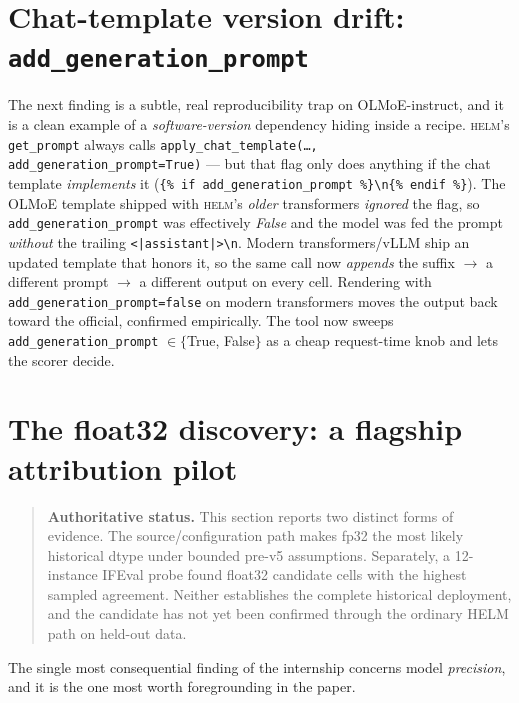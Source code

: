 \documentclass[11pt]{report}
\newcommand{\code}[1]{\texttt{#1}}
\newcommand{\evidencebox}[2]{\begin{quote}\noindent\textbf{#1.} #2\end{quote}}
\begin{document}
\section{Chat-template version drift: \code{add\_generation\_prompt}}
\label{sec:addgenprompt}

The next finding is a subtle, real reproducibility trap on OLMoE-instruct, and it
is a clean example of a \emph{software-version} dependency hiding inside a recipe.
\textsc{helm}'s \code{get\_prompt} always calls
\code{apply\_chat\_template(\ldots, add\_generation\_prompt=True)} --- but that flag
only does anything if the chat template \emph{implements} it
(\code{\{\% if add\_generation\_prompt \%\}<|assistant|>\textbackslash n\{\% endif \%\}}).
The OLMoE template shipped with \textsc{helm}'s \emph{older} transformers
\emph{ignored} the flag, so \code{add\_generation\_prompt} was effectively
\emph{False} and the model was fed the prompt \emph{without} the trailing
\code{<|assistant|>\textbackslash n}. Modern transformers/vLLM ship an updated
template that honors it, so the same call now \emph{appends} the suffix
$\rightarrow$ a different prompt $\rightarrow$ a different output on every cell.
Rendering with \code{add\_generation\_prompt=false} on modern transformers moves
the output back toward the official, confirmed empirically. The tool now sweeps
\code{add\_generation\_prompt} $\in \{$True, False$\}$ as a cheap request-time knob
and lets the scorer decide.

\section{The float32 discovery: a flagship attribution pilot}
\label{sec:fp32}

\evidencebox{Authoritative status}{This section reports two distinct forms of
evidence. The source/configuration path makes fp32 the most likely historical dtype
under bounded pre-v5 assumptions. Separately, a 12-instance IFEval probe found
float32 candidate cells with the highest sampled agreement. Neither establishes the
complete historical deployment, and the candidate has not yet been confirmed through
the ordinary HELM path on held-out data.}


The single most consequential finding of the internship concerns model
\emph{precision}, and it is the one most worth foregrounding in the paper.
\end{document}
